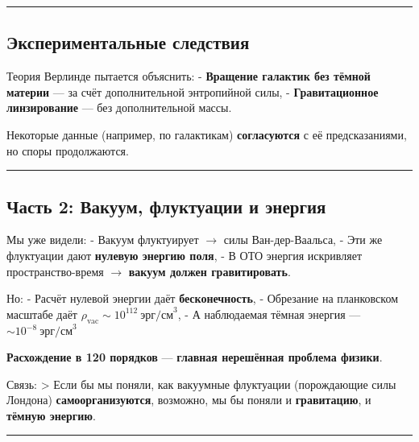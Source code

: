 \documentclass[11pt]{article}
\begin{document}
\begin{center}\rule{0.5\linewidth}{\linethickness}\end{center}

\subsection{Экспериментальные
следствия}\label{ux44dux43aux441ux43fux435ux440ux438ux43cux435ux43dux442ux430ux43bux44cux43dux44bux435-ux441ux43bux435ux434ux441ux442ux432ux438ux44f}

Теория Верлинде пытается объяснить: - \textbf{Вращение галактик без
тёмной материи} --- за счёт дополнительной энтропийной силы, -
\textbf{Гравитационное линзирование} --- без дополнительной массы.

Некоторые данные (например, по галактикам) \textbf{согласуются} с её
предсказаниями, но споры продолжаются.

\begin{center}\rule{0.5\linewidth}{\linethickness}\end{center}

\subsection{\texorpdfstring{Часть 2: \textbf{Вакуум, флуктуации и
энергия}}{Часть 2: Вакуум, флуктуации и энергия}}\label{ux447ux430ux441ux442ux44c-2-ux432ux430ux43aux443ux443ux43c-ux444ux43bux443ux43aux442ux443ux430ux446ux438ux438-ux438-ux44dux43dux435ux440ux433ux438ux44f}

Мы уже видели: - Вакуум флуктуирует $\rightarrow$ силы Ван-дер-Ваальса,
- Эти же флуктуации дают \textbf{нулевую энергию поля}, - В ОТО энергия
искривляет пространство-время $\rightarrow$ \textbf{вакуум должен
гравитировать}.

Но: - Расчёт нулевой энергии даёт \textbf{бесконечность}, - Обрезание на
планковском масштабе даёт
\(\rho_{\text{vac}} \sim 10^{112}~\text{эрг/см}^3\), - А наблюдаемая
тёмная энергия --- \(\sim 10^{-8}~\text{эрг/см}^3\)

\textbf{Расхождение в 120 порядков} --- \textbf{главная нерешённая
проблема физики}.

Связь: \textgreater{} Если бы мы поняли, как вакуумные флуктуации
(порождающие силы Лондона) \textbf{самоорганизуются}, возможно, мы бы
поняли и \textbf{гравитацию}, и \textbf{тёмную энергию}.

\begin{center}\rule{0.5\linewidth}{\linethickness}\end{center}
\end{document}
